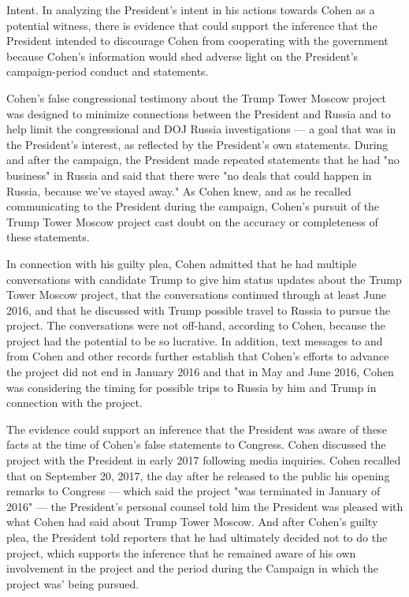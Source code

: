 Intent.
In analyzing the President's intent in his actions towards Cohen as a potential witness, there is evidence that could support the inference that the President intended to discourage Cohen from cooperating with the government because Cohen's information would shed adverse light on the President's campaign-period conduct and statements.

Cohen's false congressional testimony about the Trump Tower Moscow project was designed to minimize connections between the President and Russia and to help limit the congressional and DOJ Russia investigations — a goal that was in the President's interest, as reflected by the President's own statements.
During and after the campaign, the President made repeated statements that he had "no business" in Russia and said that there were "no deals that could happen in Russia, because we've stayed away."
As Cohen knew, and as he recalled communicating to the President during the campaign, Cohen's pursuit of the Trump Tower Moscow project cast doubt on the accuracy or completeness of these statements.

In connection with his guilty plea, Cohen admitted that he had multiple conversations with candidate Trump to give him status updates about the Trump Tower Moscow project, that the conversations continued through at least June 2016, and that he discussed with Trump possible travel to Russia to pursue the project.
The conversations were not off-hand, according to Cohen, because the project had the potential to be so lucrative.
In addition, text messages to and from Cohen and other records further establish that Cohen's efforts to advance the project did not end in January 2016 and that in May and June 2016, Cohen was considering the timing for possible trips to Russia by him and Trump in connection with the project.

The evidence could support an inference that the President was aware of these facts at the time of Cohen's false statements to Congress.
Cohen discussed the project with the President in early 2017 following media inquiries.
Cohen recalled that on September 20, 2017, the day after he released to the public his opening remarks to Congress — which said the project "was terminated in January of 2016" — the President's personal counsel told him the President was pleased with what Cohen had said about Trump Tower Moscow.
And after Cohen's guilty plea, the President told reporters that he had ultimately decided not to do the project, which supports the inference that he remained aware of his own involvement in the project and the period during the Campaign in which the project was' being pursued.

